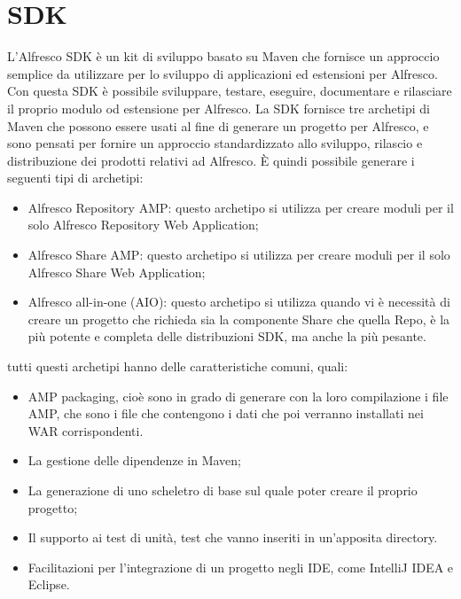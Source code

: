 \section{SDK}
L’Alfresco SDK è un kit di sviluppo basato su Maven che fornisce un approccio semplice
da utilizzare per lo sviluppo di applicazioni ed estensioni per Alfresco. Con questa SDK è
possibile sviluppare, testare, eseguire, documentare e rilasciare il proprio modulo od estensione per Alfresco. La SDK fornisce tre archetipi di Maven che possono essere
usati al fine di generare un progetto per Alfresco, e sono pensati per fornire un approccio standardizzato allo sviluppo, rilascio e distribuzione dei prodotti relativi ad Alfresco. È quindi possibile generare i
seguenti tipi di archetipi:
\begin{itemize}
\item Alfresco Repository AMP: questo archetipo si utilizza per creare moduli
per il solo Alfresco Repository Web Application;
\item Alfresco Share AMP: questo archetipo si utilizza per creare moduli per il solo
Alfresco Share Web Application;
\item Alfresco all-in-one (AIO): questo archetipo si utilizza quando vi è necessità di creare un progetto che richieda sia la componente Share che quella Repo, è la più potente e completa delle distribuzioni SDK, ma anche la più pesante.
\end{itemize}
tutti questi archetipi hanno delle caratteristiche comuni, quali:
\begin{itemize}
\item AMP packaging, cioè sono in grado di generare con la loro compilazione i file AMP, che sono i file che contengono i dati che poi verranno installati nei WAR corrispondenti.
\item La gestione delle dipendenze in Maven;
\item La generazione di uno scheletro di base sul quale poter creare il proprio progetto;
\item Il supporto ai test di unità, test che vanno inseriti in un'apposita directory.
\item Facilitazioni per l'integrazione di un progetto negli IDE, come IntelliJ IDEA e Eclipse.
\end{itemize}
